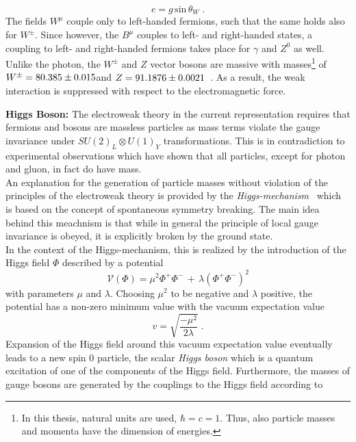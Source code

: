 \begin{description}
\begin{equation}
e = g \, \mathrm{sin} \, \theta_{W} \; .
\end{equation}
The fields $W^{\mu}$ couple only to left-handed fermions, such that the same holds also for $W^{\pm}$. Since however, the $B^{\mu}$ couples to left- and right-handed states, a coupling to left- and right-handed fermions takes place for $\gamma$ and $Z^0$ as well. Unlike the photon, the $W^{\pm}$ and $Z$ vector bosons are massive with masses\footnote{In this thesis, natural units are used, \ie $\hbar = c =1$. Thus, also particle masses and momenta have the dimension of energies.} of $W^{\pm} = 80.385 \pm 0.015$\gev and $Z = 91.1876 \pm 0.0021$\gev~\cite{Agashe:2014kda}. As a result, the weak interaction is suppressed with respect to the electromagnetic force. 
\item \textbf{Higgs Boson:} The electroweak theory in the current representation requires that fermions and bosons are massless particles as mass terms violate the gauge invariance under $SU(2)_{L} \otimes U(1)_{Y}$ transformations. This is in contradiction to experimental observations which have shown that all particles, except for photon and gluon, in fact do have mass. \\
An explanation for the generation of particle masses without violation of the principles of the electroweak theory is provided by the \textit{Higgs-mechanism}~\cite{PhysRevLett.13.508, PhysRevLett.13.321, PhysRevLett.13.585} which is based on the concept of spontaneous symmetry breaking. The main idea behind this meachnism is that while in general the principle of local gauge invariance is obeyed, it is explicitly broken by the ground state. \\
In the context of the Higgs-mechanism, this is realized by the introduction of the Higgs field $\Phi$ described by a potential 
\begin{equation*}
\mathcal{V}(\Phi) = \mu^2 \Phi^+\Phi^- \, + \, \lambda (\Phi^+\Phi^-)^2
\end{equation*}
with parameters $\mu$ and $\lambda$. Choosing $\mu^2$ to be negative and $\lambda$ positive, the potential has a non-zero minimum value with the vacuum expectation value
\begin{equation*}
v = \sqrt{\frac{-\mu^2}{2\lambda}} \; .
\end{equation*}
Expansion of the Higgs field around this vacuum expectation value eventually leads to a new spin 0 particle, the scalar \textit{Higgs boson} which is a quantum excitation of one of the components of the Higgs field. Furthermore, the masses of gauge bosons are generated by the couplings to the Higgs field according to

\end{description}
